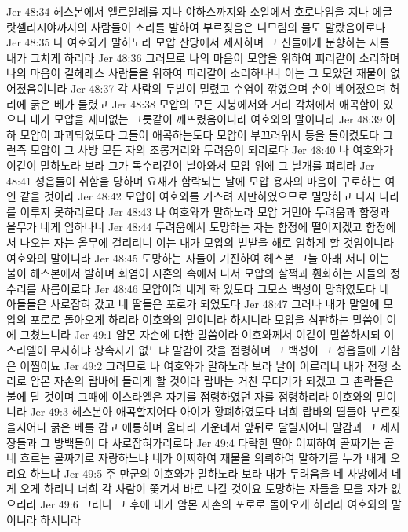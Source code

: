 Jer 48:34  헤스본에서 엘르알레를 지나 야하스까지와 소알에서 호로나임을 지나 에글랏셀리시야까지의 사람들이 소리를 발하여 부르짖음은 니므림의 물도 말랐음이로다
Jer 48:35  나 여호와가 말하노라 모압 산당에서 제사하며 그 신들에게 분향하는 자를 내가 그치게 하리라
Jer 48:36  그러므로 나의 마음이 모압을 위하여 피리같이 소리하며 나의 마음이 길헤레스 사람들을 위하여 피리같이 소리하나니 이는 그 모았던 재물이 없어졌음이니라
Jer 48:37  각 사람의 두발이 밀렸고 수염이 깎였으며 손이 베어졌으며 허리에 굵은 베가 둘렸고
Jer 48:38  모압의 모든 지붕에서와 거리 각처에서 애곡함이 있으니 내가 모압을 재미없는 그릇같이 깨뜨렸음이니라 여호와의 말이니라
Jer 48:39  아하 모압이 파괴되었도다 그들이 애곡하는도다 모압이 부끄러워서 등을 돌이켰도다 그런즉 모압이 그 사방 모든 자의 조롱거리와 두려움이 되리로다
Jer 48:40  나 여호와가 이같이 말하노라 보라 그가 독수리같이 날아와서 모압 위에 그 날개를 펴리라
Jer 48:41  성읍들이 취함을 당하며 요새가 함락되는 날에 모압 용사의 마음이 구로하는 여인 같을 것이라
Jer 48:42  모압이 여호와를 거스려 자만하였으므로 멸망하고 다시 나라를 이루지 못하리로다
Jer 48:43  나 여호와가 말하노라 모압 거민아 두려움과 함정과 올무가 네게 임하나니
Jer 48:44  두려움에서 도망하는 자는 함정에 떨어지겠고 함정에서 나오는 자는 올무에 걸리리니 이는 내가 모압의 벌받을 해로 임하게 할 것임이니라 여호와의 말이니라
Jer 48:45  도망하는 자들이 기진하여 헤스본 그늘 아래 서니 이는 불이 헤스본에서 발하며 화염이 시혼의 속에서 나서 모압의 살쩍과 훤화하는 자들의 정수리를 사름이로다
Jer 48:46  모압이여 네게 화 있도다 그모스 백성이 망하였도다 네 아들들은 사로잡혀 갔고 네 딸들은 포로가 되었도다
Jer 48:47  그러나 내가 말일에 모압의 포로로 돌아오게 하리라 여호와의 말이니라 하시니라 모압을 심판하는 말씀이 이에 그쳤느니라
Jer 49:1  암몬 자손에 대한 말씀이라 여호와께서 이같이 말씀하시되 이스라엘이 무자하냐 상속자가 없느냐 말감이 갓을 점령하며 그 백성이 그 성읍들에 거함은 어찜이뇨
Jer 49:2  그러므로 나 여호와가 말하노라 보라 날이 이르리니 내가 전쟁 소리로 암몬 자손의 랍바에 들리게 할 것이라 랍바는 거친 무더기가 되겠고 그 촌락들은 불에 탈 것이며 그때에 이스라엘은 자기를 점령하였던 자를 점령하리라 여호와의 말이니라
Jer 49:3  헤스본아 애곡할지어다 아이가 황폐하였도다 너희 랍바의 딸들아 부르짖을지어다 굵은 베를 감고 애통하며 울타리 가운데서 앞뒤로 달릴지어다 말감과 그 제사장들과 그 방백들이 다 사로잡혀가리로다
Jer 49:4  타락한 딸아 어찌하여 골짜기는 곧 네 흐르는 골짜기로 자랑하느냐 네가 어찌하여 재물을 의뢰하여 말하기를 누가 내게 오리요 하느냐
Jer 49:5  주 만군의 여호와가 말하노라 보라 내가 두려움을 네 사방에서 네게 오게 하리니 너희 각 사람이 쫓겨서 바로 나갈 것이요 도망하는 자들을 모을 자가 없으리라
Jer 49:6  그러나 그 후에 내가 암몬 자손의 포로로 돌아오게 하리라 여호와의 말이니라 하시니라
